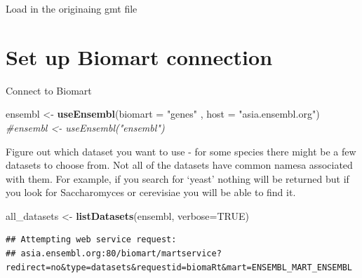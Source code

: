 \documentclass[
]{book}
\newenvironment{Shaded}{\begin{snugshade}}{\end{snugshade}}
\newcommand{\AttributeTok}[1]{\textcolor[rgb]{0.13,0.29,0.53}{#1}}
\newcommand{\CommentTok}[1]{\textcolor[rgb]{0.56,0.35,0.01}{\textit{#1}}}
\newcommand{\ConstantTok}[1]{\textcolor[rgb]{0.56,0.35,0.01}{#1}}
\newcommand{\FunctionTok}[1]{\textcolor[rgb]{0.13,0.29,0.53}{\textbf{#1}}}
\newcommand{\NormalTok}[1]{#1}
\newcommand{\OtherTok}[1]{\textcolor[rgb]{0.56,0.35,0.01}{#1}}
\newcommand{\SpecialCharTok}[1]{\textcolor[rgb]{0.81,0.36,0.00}{\textbf{#1}}}
\newcommand{\StringTok}[1]{\textcolor[rgb]{0.31,0.60,0.02}{#1}}
\begin{document}
Load in the originaing gmt file

\hypertarget{set-up-biomart-connection-1}{%
\section{Set up Biomart connection}\label{set-up-biomart-connection-1}}

Connect to Biomart

\begin{Shaded}
\begin{Highlighting}[]
\NormalTok{ensembl }\OtherTok{\textless{}{-}} \FunctionTok{useEnsembl}\NormalTok{(}\AttributeTok{biomart =} \StringTok{"genes"}\NormalTok{ , }\AttributeTok{host =} \StringTok{"asia.ensembl.org"}\NormalTok{)}
\CommentTok{\#ensembl \textless{}{-} useEnsembl("ensembl")}
\end{Highlighting}
\end{Shaded}

Figure out which dataset you want to use - for some species there might be a few datasets to choose from. Not all of the datasets have common namesa associated with them. For example, if you search for `yeast' nothing will be returned but if you look for Saccharomyces or cerevisiae you will be able to find it.

\begin{Shaded}
\begin{Highlighting}[]
\NormalTok{all\_datasets }\OtherTok{\textless{}{-}} \FunctionTok{listDatasets}\NormalTok{(ensembl, }\AttributeTok{verbose=}\ConstantTok{TRUE}\NormalTok{)}
\end{Highlighting}
\end{Shaded}

\begin{verbatim}
## Attempting web service request:
## asia.ensembl.org:80/biomart/martservice?redirect=no&type=datasets&requestid=biomaRt&mart=ENSEMBL_MART_ENSEMBL
\end{verbatim}

\begin{Shaded}
\end{Shaded}
\end{document}
